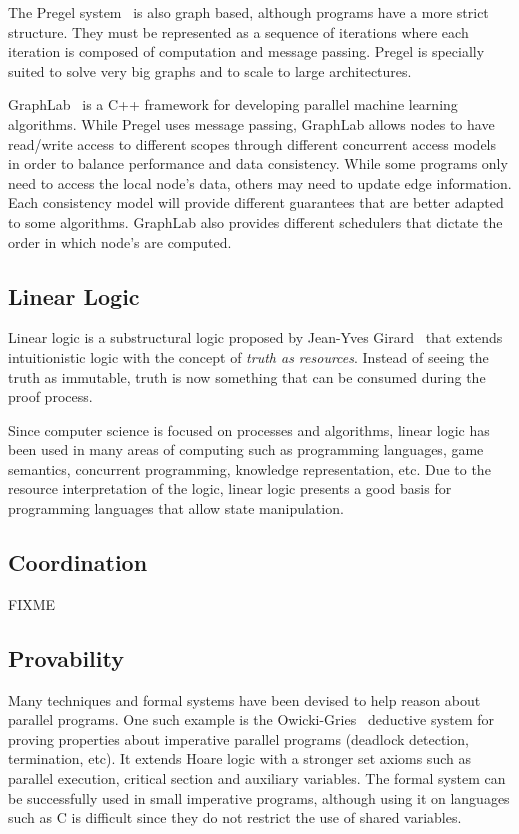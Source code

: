 The Pregel system~\cite{Malewicz:2010:PSL:1807167.1807184} is also graph based, although programs have a more strict
structure. They must be represented as a sequence of iterations where each iteration is composed of computation and message passing.
Pregel is specially suited to solve very big graphs
and to scale to large architectures.

GraphLab~\cite{GraphLab2010} is a C++ framework for developing parallel machine learning
algorithms. While Pregel uses message passing, GraphLab allows nodes to have read/write
access to different scopes through different concurrent access models in order to balance
performance and data consistency. While some programs only need to access the local node's
data, others may need to update edge information. Each consistency model will provide different
guarantees that are better adapted to some algorithms. GraphLab also provides different
schedulers that dictate the order in which node's are computed.

\subsection{Linear Logic}

Linear logic is a substructural logic proposed by Jean-Yves Girard~\cite{Girard95logic:its} that extends intuitionistic logic with the concept of \emph{truth as resources}. Instead of seeing the truth as immutable, truth is now something that can be consumed during the proof process.

Since computer science is focused on processes and algorithms, linear logic has been used
in many areas of computing such as programming languages, game semantics, concurrent programming, knowledge representation, etc.
Due to the resource interpretation of the logic, linear logic presents a good basis for programming
languages that allow state manipulation.

\subsection{Coordination}

FIXME

\subsection{Provability}

Many techniques and formal systems have been devised to help reason about parallel programs.
One such example is the Owicki-Gries~\cite{Owicki:1976:VPP:360051.360224} deductive system
for proving properties about imperative parallel programs (deadlock detection, termination, etc).
It extends Hoare logic with a stronger set axioms such as parallel execution, critical section
and auxiliary variables. The formal system can be successfully used in small imperative
programs, although using it on languages such as C is difficult since they do not
restrict the use of shared variables.

